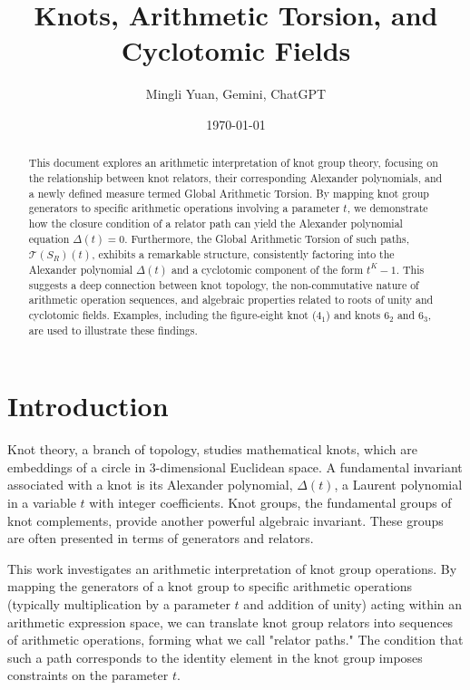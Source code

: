 \documentclass{article}[a4paper,12pt]
\title{Knots, Arithmetic Torsion, and Cyclotomic Fields}
\author{Mingli Yuan, Gemini, ChatGPT}
\date{\today}
\begin{document}
\maketitle

\begin{abstract}
This document explores an arithmetic interpretation of knot group theory, focusing on the relationship between knot relators, their corresponding Alexander polynomials, and a newly defined measure termed Global Arithmetic Torsion. By mapping knot group generators to specific arithmetic operations involving a parameter $t$, we demonstrate how the closure condition of a relator path can yield the Alexander polynomial equation $\Delta(t)=0$. Furthermore, the Global Arithmetic Torsion of such paths, $\mathcal{T}(S_R)(t)$, exhibits a remarkable structure, consistently factoring into the Alexander polynomial $\Delta(t)$ and a cyclotomic component of the form $t^K-1$. This suggests a deep connection between knot topology, the non-commutative nature of arithmetic operation sequences, and algebraic properties related to roots of unity and cyclotomic fields. Examples, including the figure-eight knot ($4_1$) and knots $6_2$ and $6_3$, are used to illustrate these findings.
\end{abstract}

\section{Introduction}

Knot theory, a branch of topology, studies mathematical knots, which are embeddings of a circle in 3-dimensional Euclidean space. A fundamental invariant associated with a knot is its Alexander polynomial, $\Delta(t)$, a Laurent polynomial in a variable $t$ with integer coefficients. Knot groups, the fundamental groups of knot complements, provide another powerful algebraic invariant. These groups are often presented in terms of generators and relators.

This work investigates an arithmetic interpretation of knot group operations. By mapping the generators of a knot group to specific arithmetic operations (typically multiplication by a parameter $t$ and addition of unity) acting within an arithmetic expression space, we can translate knot group relators into sequences of arithmetic operations, forming what we call "relator paths." The condition that such a path corresponds to the identity element in the knot group imposes constraints on the parameter $t$.
\end{document}
